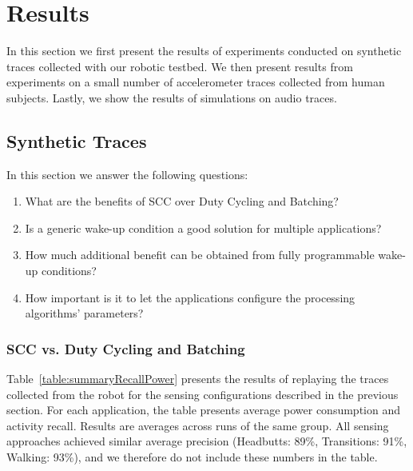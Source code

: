 


\section{Results}
\label{sec:results}

In this section we first present the results of experiments conducted
on synthetic traces collected with our robotic testbed.  We then
present results from experiments on a small number of accelerometer
traces collected from human subjects.  Lastly, we show the results
of simulations on audio traces.

\subsection{Synthetic Traces}

In this section we answer the following questions:

\begin{enumerate}
\setlength{\itemsep}{-3pt}  

\item What are the benefits of SCC over Duty Cycling and
  Batching?

\item Is a generic wake-up condition a good solution for multiple 
  applications?

\item How much additional benefit can be obtained from fully
  programmable wake-up conditions?

\item How important is it to let the applications configure
  the processing algorithms' parameters?
  
\end{enumerate}


\subsubsection{SCC vs. Duty Cycling and Batching}

Table~\ref{table:summaryRecallPower} presents the results of replaying
the traces collected from the robot for the sensing configurations
described in the previous section.  For each application, the table
presents average power consumption and activity recall.  Results are
averages across runs of the same group.  All sensing approaches achieved similar
average precision (Headbutts: 89\%, Transitions: 91\%, Walking:
93\%), and we therefore do not include these numbers in the table.


